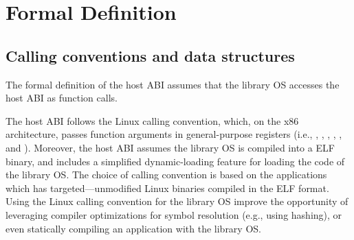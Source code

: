 \section{Formal Definition}


\subsection{Calling conventions and data structures}


The formal definition of the host ABI assumes that 
the library OS accesses the host ABI as function calls.






The host ABI follows the Linux calling convention,
which, on the x86 architecture, passes function arguments in general-purpose registers (i.e., , , , , , and ).
Moreover, the host ABI assumes the library OS is compiled into a ELF binary, and includes a simplified dynamic-loading feature for loading the code of the library OS.
The choice of calling convention is based on
the applications which \graphene{} has targeted---unmodified Linux binaries compiled in the ELF format.
Using the Linux calling convention for the library OS
improve the opportunity of leveraging compiler optimizations for symbol resolution (e.g., using hashing), or even statically compiling an application with the library OS. 











